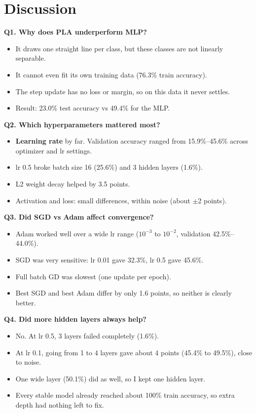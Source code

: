\documentclass[12pt,a4paper]{article}
\begin{document}
\section{Discussion}
\textbf{Q1. Why does PLA underperform MLP?}
\begin{itemize}
\item It draws one straight line per class, but these classes are not linearly separable.
\item It cannot even fit its own training data (76.3\% train accuracy).
\item The step update has no loss or margin, so on this data it never settles.
\item Result: 23.0\% test accuracy vs 49.4\% for the MLP.
\end{itemize}

\textbf{Q2. Which hyperparameters mattered most?}
\begin{itemize}
\item \textbf{Learning rate} by far. Validation accuracy ranged from 15.9\%--45.6\% across optimizer and lr settings.
\item lr 0.5 broke batch size 16 (25.6\%) and 3 hidden layers (1.6\%).
\item L2 weight decay helped by 3.5 points.
\item Activation and loss: small differences, within noise (about $\pm$2 points).
\end{itemize}

\textbf{Q3. Did SGD vs Adam affect convergence?}
\begin{itemize}
\item Adam worked well over a wide lr range ($10^{-3}$ to $10^{-2}$, validation 42.5\%--44.0\%).
\item SGD was very sensitive: lr 0.01 gave 32.3\%, lr 0.5 gave 45.6\%.
\item Full batch GD was slowest (one update per epoch).
\item Best SGD and best Adam differ by only 1.6 points, so neither is clearly better.
\end{itemize}

\textbf{Q4. Did more hidden layers always help?}
\begin{itemize}
\item No. At lr 0.5, 3 layers failed completely (1.6\%).
\item At lr 0.1, going from 1 to 4 layers gave about 4 points (45.4\% to 49.5\%), close to noise.
\item One wide layer (50.1\%) did as well, so I kept one hidden layer.
\item Every stable model already reached about 100\% train accuracy, so extra depth had nothing left to fix.
\end{itemize}
\end{document}
